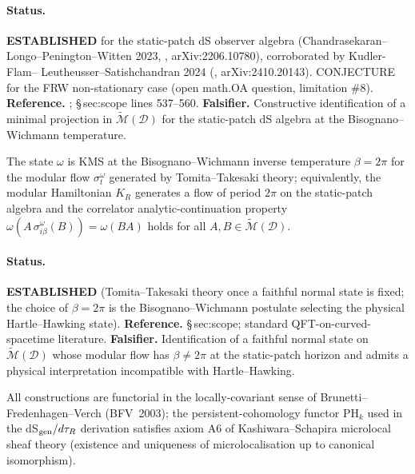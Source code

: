 \paragraph{Status.}  \textbf{ESTABLISHED} for the static-patch dS
observer algebra (Chandrasekaran--Longo--Penington--Witten 2023,
\cite{CLPW23}, arXiv:2206.10780), corroborated by Kudler-Flam--%
Leutheusser--Satishchandran 2024
(\cite{KLS24}, arXiv:2410.20143).  CONJECTURE for the FRW non-stationary
case (open math.OA question, \cite{eci.tex} limitation \#8).
\textbf{Reference.}  \cite{CLPW23,KLS24}; \cite{eci.tex} \S\,sec:scope
lines 537--560.  \textbf{Falsifier.}  Constructive identification of a
minimal projection in $\widetilde{\mathcal{M}}(\mathcal{D})$ for the
static-patch dS algebra at the Bisognano--Wichmann temperature.

\begin{axiom*}[$H_2$, KMS at $\beta=2\pi$ (Bisognano--Wichmann)]
The state $\omega$ is KMS at the Bisognano--Wichmann inverse temperature
$\beta = 2\pi$ for the modular flow $\sigma^\omega_t$ generated by
Tomita--Takesaki theory; equivalently, the modular Hamiltonian $K_R$
generates a flow of period $2\pi$ on the static-patch algebra and the
correlator analytic-continuation property
$\omega(A\,\sigma^\omega_{i\beta}(B)) = \omega(BA)$ holds for all
$A,B\in\widetilde{\mathcal{M}}(\mathcal{D})$.
\end{axiom*}

\paragraph{Status.}  \textbf{ESTABLISHED} (Tomita--Takesaki theory once
a faithful normal state is fixed; the choice of $\beta = 2\pi$ is the
Bisognano--Wichmann postulate selecting the physical Hartle--Hawking
state).  \textbf{Reference.}  \cite{eci.tex} \S\,sec:scope; standard
QFT-on-curved-spacetime literature.  \textbf{Falsifier.}  Identification
of a faithful normal state on $\widetilde{\mathcal{M}}(\mathcal{D})$
whose modular flow has $\beta\neq 2\pi$ at the static-patch horizon and
admits a physical interpretation incompatible with Hartle--Hawking.

\begin{axiom*}
All constructions are functorial in the locally-covariant sense of
Brunetti--Fredenhagen--Verch (BFV~2003); the persistent-cohomology
functor PH$_k$ used in the dS$_{\rm gen}/d\tau_R$ derivation satisfies
axiom A6 of Kashiwara--Schapira microlocal sheaf theory (existence and
uniqueness of microlocalisation up to canonical isomorphism).
\end{axiom*}

